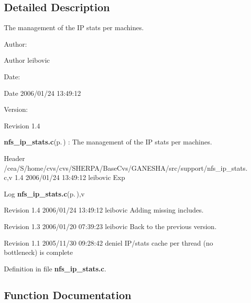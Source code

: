 \subsection{Detailed Description}
The management of the IP stats per machines. 

\begin{Desc}
\item[Author:]\begin{Desc}
\item[Author]leibovic \end{Desc}
\end{Desc}
\begin{Desc}
\item[Date:]\begin{Desc}
\item[Date]2006/01/24 13:49:12 \end{Desc}
\end{Desc}
\begin{Desc}
\item[Version:]\begin{Desc}
\item[Revision]1.4 \end{Desc}
\end{Desc}
{\bf nfs\_\-ip\_\-stats.c}{\rm (p.\,\pageref{nfs__ip__stats_8c})} : The management of the IP stats per machines.

\begin{Desc}
\item[Header]/cea/S/home/cvs/cvs/SHERPA/Base\-Cvs/GANESHA/src/support/nfs\_\-ip\_\-stats.c,v 1.4 2006/01/24 13:49:12 leibovic Exp \end{Desc}


\begin{Desc}
\item[Log]{\bf nfs\_\-ip\_\-stats.c}{\rm (p.\,\pageref{nfs__ip__stats_8c})},v \end{Desc}
Revision 1.4 2006/01/24 13:49:12 leibovic Adding missing includes.

Revision 1.3 2006/01/20 07:39:23 leibovic Back to the previous version.

Revision 1.1 2005/11/30 09:28:42 deniel IP/stats cache per thread (no bottleneck) is complete

Definition in file {\bf nfs\_\-ip\_\-stats.c}.

\subsection{Function Documentation}
